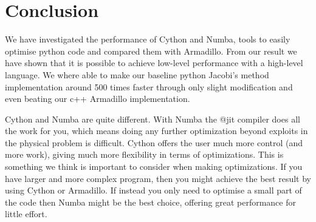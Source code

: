 \section*{Conclusion} 
We have investigated the performance of Cython and Numba, tools to easily
optimise python code and compared them with Armadillo. 
From our result we have shown that it is possible to achieve low-level
performance with a high-level language. We where able to make our baseline
python Jacobi's method implementation around 500 times faster through only
slight modification and even beating our c++ Armadillo implementation. 

Cython and Numba are quite different. With Numba 
the @jit compiler does all the work for you, which means doing any further
optimization beyond exploits in the physical problem is difficult. 
Cython offers the user much more control (and more work), giving 
much more flexibility in terms of optimizations. This is something we think is
important to consider when making optimizations. If you have larger and more
complex program, then you might achieve the best result by using Cython or
Armadillo. If instead you only need to optimise a small part of the code then
Numba might be the best choice, offering great performance for little effort. 
